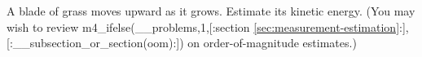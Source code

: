 A blade of grass moves upward as it grows. Estimate its
kinetic energy.
(You may wish to review 
m4_ifelse(__problems,1,[:section \ref{sec:measurement-estimation}:],[:__subsection_or_section(oom):])
on order-of-magnitude estimates.)
